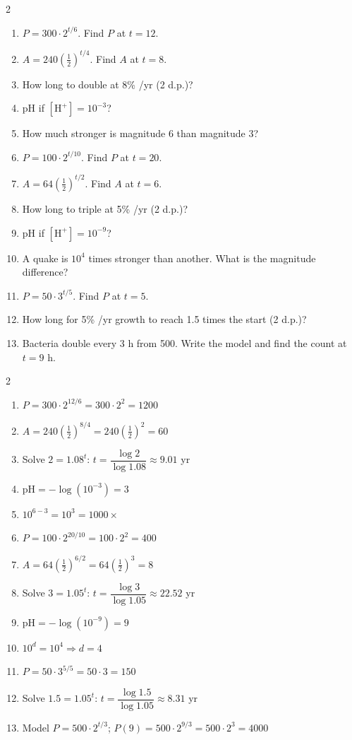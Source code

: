 \documentclass[11pt]{article}
\begin{document}
\clearpage
{}

\begin{recapbox}
\begin{multicols}{2}
\small
\begin{enumerate}[leftmargin=*,itemsep=3pt]
  \item $P=300\cdot2^{t/6}$. Find $P$ at $t=12$.
  \item $A=240(\tfrac12)^{t/4}$. Find $A$ at $t=8$.
  \item How long to double at 8\% /yr (2 d.p.)?
  \item pH if $[\text{H}^+]=10^{-3}$?
  \item How much stronger is magnitude 6 than magnitude 3?
  \item $P=100\cdot2^{t/10}$. Find $P$ at $t=20$.
  \item $A=64(\tfrac12)^{t/2}$. Find $A$ at $t=6$.
  \item How long to triple at 5\% /yr (2 d.p.)?
  \item pH if $[\text{H}^+]=10^{-9}$?
  \item A quake is $10^4$ times stronger than another. What is the magnitude difference?
  \item $P=50\cdot3^{t/5}$. Find $P$ at $t=5$.
  \item How long for 5\% /yr growth to reach 1.5 times the start (2 d.p.)?
  \item Bacteria double every 3 h from 500. Write the model and find the count at $t=9$ h.
\end{enumerate}
\end{multicols}
\end{recapbox}

\begin{keybox}
\begin{multicols}{2}
\small
\begin{enumerate}[leftmargin=*,itemsep=3pt]
  \item $P=300\cdot2^{12/6}=300\cdot2^2=1200$
  \item $A=240\left(\tfrac12\right)^{8/4}=240\left(\tfrac12\right)^2=60$
  \item Solve $2=1.08^t$: $t=\dfrac{\log2}{\log1.08}\approx9.01$ yr
  \item $\text{pH}=-\log(10^{-3})=3$
  \item $10^{6-3}=10^3=1000\times$
  \item $P=100\cdot2^{20/10}=100\cdot2^2=400$
  \item $A=64\left(\tfrac12\right)^{6/2}=64\left(\tfrac12\right)^3=8$
  \item Solve $3=1.05^t$: $t=\dfrac{\log3}{\log1.05}\approx22.52$ yr
  \item $\text{pH}=-\log(10^{-9})=9$
  \item $10^d=10^4\Rightarrow d=4$
  \item $P=50\cdot3^{5/5}=50\cdot3=150$
  \item Solve $1.5=1.05^t$: $t=\dfrac{\log1.5}{\log1.05}\approx8.31$ yr
  \item Model $P=500\cdot2^{t/3}$; $P(9)=500\cdot2^{9/3}=500\cdot2^3=4000$
\end{enumerate}
\end{multicols}
\end{keybox}
\end{document}
